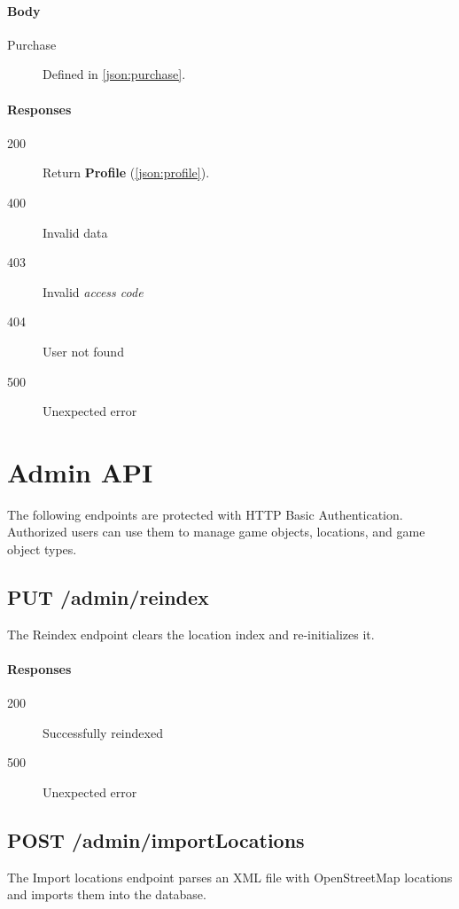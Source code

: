 		\paragraph*{Body}
			\begin{description}
				\item[Purchase] Defined in \ref{json:purchase}.
			\end{description}
		\paragraph*{Responses}
			\begin{description}		
				\item[200] Return \textbf{Profile} (\ref{json:profile}).
				\item[400] Invalid data
				\item[403] Invalid \textit{access code}
				\item[404] User not found
				\item[500] Unexpected error
			\end{description}

\section{Admin API}
The following endpoints are protected with HTTP Basic Authentication. Authorized users can use them to manage game objects, locations, and game object types.

	\subsection{PUT /admin/reindex}
	The Reindex endpoint clears the location index and re-initializes it.
		\paragraph*{Responses}
		\begin{description}		
			\item[200] Successfully reindexed
			\item[500] Unexpected error
		\end{description}

	\subsection{POST /admin/importLocations}
	The Import locations endpoint parses an XML file with OpenStreetMap locations and imports them into the database.
